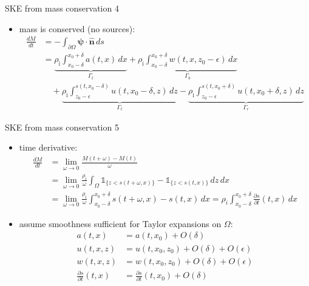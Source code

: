 \documentclass[10pt,dvipsnames]{beamer}
\newcommand{\hbn}{\hat{\mathbf{n}}}
\newcommand{\bpsi}{\bm{\psi}}
\newcommand{\eps}{\epsilon}
\newcommand{\rhoi}{\rho_{\text{i}}}
\begin{document}
\begin{frame}{SKE from mass conservation 4}

\begin{itemize}
\item mass is conserved (no sources):
\begin{align*}
\frac{dM}{dt} &= - \int_{\partial \Omega} \bpsi \cdot \hbn\,ds \\
  &= \underbrace{\rhoi \int_{x_0-\delta}^{x_0+\delta} a(t,x)\,dx}_{\Gamma_t} + \underbrace{\rhoi \int_{x_0-\delta}^{x_0+\delta} w(t,x,z_0-\eps)\,dx}_{\Gamma_b} \\
  &\quad + \underbrace{\rhoi \int_{z_0-\eps}^{s(t,x_0-\delta)} u(t,x_0-\delta,z)\,dz}_{\Gamma_\ell} - \underbrace{\rhoi \int_{z_0-\eps}^{s(t,x_0+\delta)} u(t,x_0+\delta,z)\,dz}_{\Gamma_r}
\end{align*}

\end{itemize}
\end{frame}

\begin{frame}{SKE from mass conservation 5}

\begin{itemize}
\item time derivative:
\begin{align*}
\frac{dM}{dt} &= \lim_{\omega\to 0} \frac{M(t+\omega) - M(t)}{\omega} \\
    &= \lim_{\omega\to 0} \frac{\rhoi}{\omega} \int_\Omega \mathbb{1}_{\{z<s(t+\omega,x)\}} - \mathbb{1}_{\{z<s(t,x)\}}\,dz\,dx \\
    &= \lim_{\omega\to 0} \frac{\rhoi}{\omega} \int_{x_0-\delta}^{x_0+\delta} s(t+\omega,x) - s(t,x)\,dx = \rho_i \int_{x_0-\delta}^{x_0+\delta} \frac{\partial s}{\partial t}(t,x)\,dx
\end{align*}
\item assume smoothness sufficient for Taylor expansions on $\Omega$:
\begin{align*}
a(t,x) &= a(t,x_0) + O(\delta) \\
u(t,x,z) &= u(t,x_0,z_0) + O(\delta) + O(\eps) \\
w(t,x,z) &= w(t,x_0,z_0) + O(\delta) + O(\eps) \\
\frac{\partial s}{\partial t}(t,x) &= \frac{\partial s}{\partial t}(t,x_0) + O(\delta)
\end{align*}
\end{itemize}
\end{frame}
\end{document}
